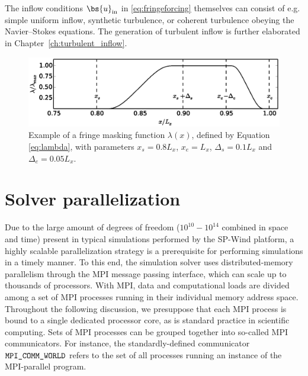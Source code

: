 The inflow conditions $\bs{u}_{\text{in}}$ in \eqref{eq:fringeforcing} themselves can consist of e.g. simple uniform inflow, synthetic turbulence, or coherent turbulence obeying the Navier--Stokes equations. The generation of turbulent inflow is further elaborated in Chapter~\ref{ch:turbulent_inflow}. 

\begin{figure}[t]
	\centering
	\includegraphics[width = \textwidth,trim= 0cm 4.4cm 0cm 5cm,clip]{chapters/methodology/lambda_fringefunction.eps}
	\caption{Example of a fringe masking function $\lambda(x)$, defined by Equation \eqref{eq:lambda}, with parameters $x_{s} = 0.8L_x$, $x_{e} = L_x$, $\Delta_{s} = 0.1L_x$ and $\Delta_{e} = 0.05L_x$.}
	\label{fig:lambda}
\end{figure}	



\section{Solver parallelization}\label{sec:meth_par}
Due to the large amount of degrees of freedom ($10^{10} - 10^{14}$ combined in space and time) present in typical simulations performed by the SP-Wind platform, a highly scalable parallelization strategy is a prerequisite for performing simulations in a timely manner. To this end, the simulation solver uses distributed-memory parallelism through the MPI message passing interface, which can scale up to thousands of processors. With MPI, data and computational loads are divided among a set of MPI processes running in their individual memory address space. Throughout the following discussion, we presuppose that each MPI process is bound to a single dedicated processor core, as is standard practice in scientific computing. Sets of MPI processes can be grouped together into so-called MPI communicators. For instance, the standardly-defined communicator $\verb|MPI_COMM_WORLD|$ refers to the set of all processes running an instance of the MPI-parallel program.

